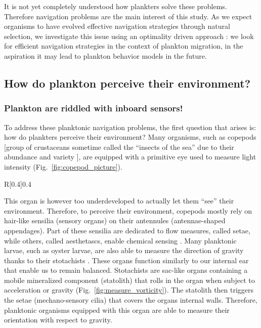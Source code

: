 It is not yet completely understood how plankters solve these problems.
Therefore navigation problems are the main interest of this study.
As we expect organisms to have evolved effective navigation strategies through natural selection, we investigate this issue using an optimality driven approach \citep{smith2011optimality}: we look for efficient navigation strategies in the context of plankton migration, in the aspiration it may lead to plankton behavior models in the future.

\subsection{How do plankton perceive their environment?}

\subsubsection{Plankton are riddled with inboard sensors!}

To address these planktonic navigation problems, the first question that arises is: how do plankters perceive their environment?
Many organisms, such as copepods [group of crustaceans sometime called the ``insects of the sea'' due to their abundance and variety \citep{schminke2007entomology}], are equipped with a primitive eye used to measure light intensity (Fig.~\ref{fig:copepod_picture}).
\begin{wrapfigure}[13]{R}[0.4\width]{0.4\textwidth}
	\vspace{-35pt}
	\centering
	\def\svgwidth{0.35\textwidth}
	
	\captionsetup{width=0.35\textwidth}
  	\caption[Annotated picture of copepod]{
  		Annotated picture of copepod (Female adult \textit{Acartia Clausi}). 
  		Original picture by Minami Himemiya \ccbysa  ~ v3.0.
  	}
  	\label{fig:copepod_picture}
\end{wrapfigure}
This organ is however too underdeveloped to actually let them ``see'' their environment.
Therefore, to perceive their environment, copepods mostly rely on hair-like sensilia (sensory organs) on their antennules (antennae-shaped appendages).
Part of these sensilia are dedicated to flow measures, called setae, while others, called aesthetascs, enable chemical sensing \citep{heuschele2014chemical}.
Many planktonic larvae, such as oyster larvae, are also able to measure the direction of gravity thanks to their stotachists \citep{fuchs2015hydrodynamic}.
These organs function similarly to our internal ear that enable us to remain balanced.
Stotachists are sac-like organs containing a mobile mineralized component (statolith) that rolls in the organ when subject to acceleration or gravity (Fig.~\ref{fig:measure_vorticity}).
The statolith then triggers the setae (mechano-sensory cilia) that covers the organs internal walls.
Therefore, planktonic organisms equipped with this organ are able to measure their orientation with respect to gravity.

